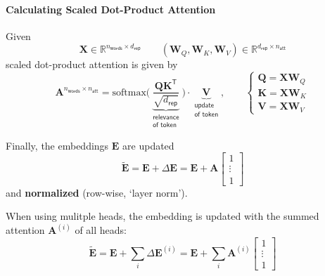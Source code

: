 \paragraph{Calculating Scaled Dot-Product Attention}

Given
\noindent\begin{equation*}
    \mathbf{X}\in \mathbb{R}^{n_{\mathsf{words}} \times d_{\mathsf{rep}}}\qquad (\mathbf{W}_Q, \mathbf{W}_K, \mathbf{W}_V)\in \mathbb{R}^{d_{\mathsf{rep}}\times n_{\mathsf{att}}}
\end{equation*}
scaled dot-product attention is given by
\noindent\begin{equation*}
    \mathbf{A}^{n_{\mathsf{words}}\times n_{\mathsf{att}}} = \mathrm{softmax}\Biggl(\underbrace{\frac{\mathbf{QK}^{\mathsf{T}}}{\sqrt{d_{\mathsf{rep}}}}}_{\substack{\textsf{relevance} \\ \textsf{of token}}}\Biggr)\cdot \underbrace{\mathbf{V}}_{\substack{\textsf{update} \\ \textsf{of token}}},\qquad
    \begin{cases}
        \mathbf{Q} = \mathbf{XW}_Q \\
        \mathbf{K} = \mathbf{XW}_K \\
        \mathbf{V} = \mathbf{XW}_V
    \end{cases}
\end{equation*}

Finally, the embeddings $\mathbf{E}$ are updated
\noindent\begin{equation*}
    \tilde{\mathbf{E}} = \mathbf{E} + \Delta \mathbf{E} = \mathbf{E} + \mathbf{A}\begin{bmatrix}
        1 \\ \vdots \\ 1
    \end{bmatrix}
\end{equation*}
and \textbf{normalized} (row-wise, `layer norm').

\newpar{}

When using mulitple heads, the embedding is updated with the summed attention $\mathbf{A}^{(i)}$ of all heads:
\noindent\begin{equation*}
    \tilde{\mathbf{E}} = \mathbf{E} + \sum_i \Delta \mathbf{E}^{(i)} = \mathbf{E} + \sum_{i} \mathbf{A}^{(i)}\begin{bmatrix}
        1 \\ \vdots \\ 1
    \end{bmatrix}
\end{equation*}

